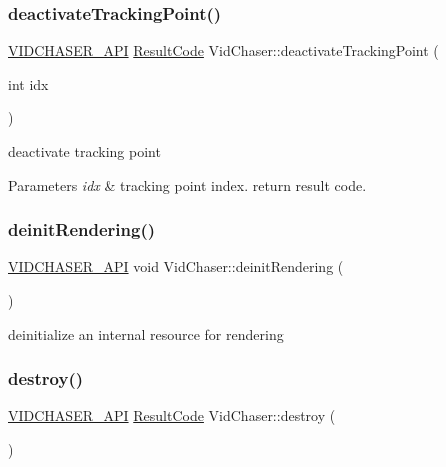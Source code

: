 \subsubsection{\texorpdfstring{deactivate\+Tracking\+Point()}{deactivateTrackingPoint()}}
{\footnotesize\ttfamily \hyperlink{_vid_chaser_a_p_i_8h_abe868bb94e22f611aece5087695f9ef3}{V\+I\+D\+C\+H\+A\+S\+E\+R\+\_\+\+A\+PI} \hyperlink{namespace_vid_chaser_a9a65fd4518380d53654f1af799cbf8ed}{Result\+Code} Vid\+Chaser\+::deactivate\+Tracking\+Point (\begin{DoxyParamCaption}\item[{int}]{idx }\end{DoxyParamCaption})}



deactivate tracking point 


\begin{DoxyParams}{Parameters}
{\em idx} & tracking point index. return result code. \\
\hline
\end{DoxyParams}
\mbox{\label{namespace_vid_chaser_a5efdacefec8542b2d3935b87303dd442}} 
\subsubsection{\texorpdfstring{deinit\+Rendering()}{deinitRendering()}}
{\footnotesize\ttfamily \hyperlink{_vid_chaser_a_p_i_8h_abe868bb94e22f611aece5087695f9ef3}{V\+I\+D\+C\+H\+A\+S\+E\+R\+\_\+\+A\+PI} void Vid\+Chaser\+::deinit\+Rendering (\begin{DoxyParamCaption}{ }\end{DoxyParamCaption})}



deinitialize an internal resource for rendering 

\mbox{\label{namespace_vid_chaser_a1203d8bbc0f9fd8d15c8e7ad4a39d0a1}} 
\subsubsection{\texorpdfstring{destroy()}{destroy()}}
{\footnotesize\ttfamily \hyperlink{_vid_chaser_a_p_i_8h_abe868bb94e22f611aece5087695f9ef3}{V\+I\+D\+C\+H\+A\+S\+E\+R\+\_\+\+A\+PI} \hyperlink{namespace_vid_chaser_a9a65fd4518380d53654f1af799cbf8ed}{Result\+Code} Vid\+Chaser\+::destroy (\begin{DoxyParamCaption}{ }\end{DoxyParamCaption})}



